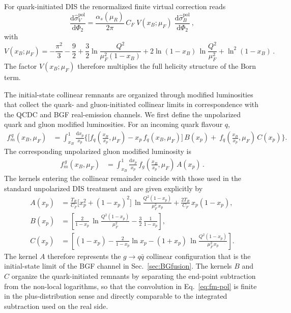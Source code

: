 \documentclass[a4paper,11pt]{article}
\begin{document}
For quark-initiated DIS the renormalized finite virtual correction reads
\begin{equation}
\frac{\mathrm{d}\hat\sigma_V^{\text{pol}}}{\mathrm{d}\Phi_2}
=
\frac{\alpha_s(\mu_R)}{2\pi}\,C_F\;
V(x_B;\mu_F)\;
\frac{\mathrm{d}\hat\sigma_B^{\text{pol}}}{\mathrm{d}\Phi_2}\,,
\label{eq:virt-pol}
\end{equation}
with
\begin{equation}
V(x_B;\mu_F)=
-\frac{\pi^2}{3}-\frac{9}{2}
+\frac{3}{2}\ln\!\frac{Q^2}{\mu_F^2(1-x_B)}
+2\ln(1-x_B)\,\ln\!\frac{Q^2}{\mu_F^2}
+\ln^2(1-x_B)\,.
\label{eq:VxB}
\end{equation}
The factor $V(x_B;\mu_F)$ therefore multiplies the full helicity structure of the Born term.

The initial-state collinear remnants are organized through modified luminosities that collect the quark- and gluon-initiated collinear limits in correspondence with the QCDC and BGF real-emission channels.
We first define the unpolarized quark and gluon modified luminosities. For an incoming quark flavour $q$,
\begin{align}
f^{\,q}_m(x_B,\mu_F)
&=\int_{x_B}^{1}\frac{\mathrm{d}x_p}{x_p}\Bigg\{
\Big[f_q\!\left(\frac{x_B}{x_p},\mu_F\right)-x_p\,f_q(x_B,\mu_F)\Big]\,B(x_p)
+\ f_q\!\left(\frac{x_B}{x_p},\mu_F\right)\,C(x_p)
\Bigg\}.
\label{eq:fm-pol}
\end{align}
The corresponding unpolarized gluon modified luminosity is
\begin{align}
f^{\,g}_m(x_B,\mu_F)
&=\int_{x_B}^{1}\frac{\mathrm{d}x_p}{x_p}\,
f_g\!\left(\frac{x_B}{x_p},\mu_F\right)\,A(x_p)\,.
\label{eq:fmg-pol}
\end{align}
The kernels entering the collinear remainder coincide with those used in the standard unpolarized DIS treatment and are given explicitly by
\begin{align}
A(x_p)&=\frac{T_R}{C_F}\Big[x_p^2+(1-x_p)^2\Big]\,
\ln\!\frac{Q^2(1-x_p)}{\mu_F^2\,x_p}
+\frac{2T_R}{C_F}\,x_p(1-x_p),
\label{eq:A-kernel}\\[1mm]
B(x_p)&=\left[\frac{2}{1-x_p}\,\ln\!\frac{Q^2(1-x_p)}{\mu_F^2}-\frac{3}{2}\,\frac{1}{1-x_p}\right],
\label{eq:B-kernel}\\[1mm]
C(x_p)&=\left[(1-x_p)-\frac{2}{1-x_p}\ln x_p-(1+x_p)\,\ln\!\frac{Q^2(1-x_p)}{\mu_F^2\,x_p}\right].
\label{eq:C-kernel}
\end{align}
The kernel $A$ therefore represents the $g\!\to\! q\bar q$ collinear configuration that is the initial-state limit of the BGF channel in Sec.~\ref{sec:BGfusion}. The kernels $B$ and $C$ organize the quark-initiated remnants by separating the end-point subtraction from the non-local logarithms, so that the convolution in Eq.~\eqref{eq:fm-pol} is finite in the plus-distribution sense and directly comparable to the integrated subtraction used on the real side.
\end{document}
